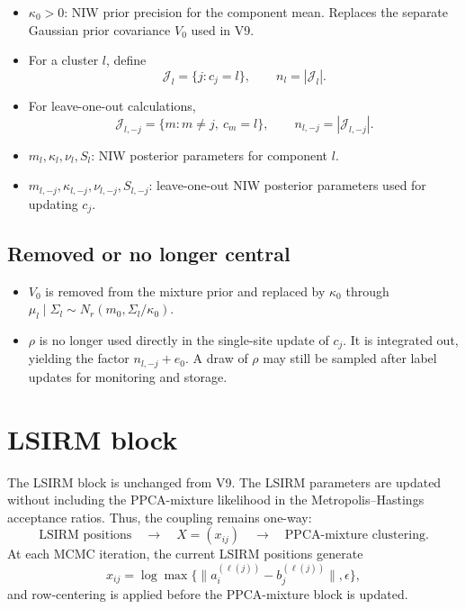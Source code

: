 \documentclass[11pt]{article}
\begin{document}
\begin{itemize}[leftmargin=1.5em]
    \item $\kappa_0>0$: NIW prior precision for the component mean.
    Replaces the separate Gaussian prior covariance $V_0$ used in V9.
    \item For a cluster $l$, define
    \[
        \mathcal J_l=\{j:c_j=l\},\qquad n_l=|\mathcal J_l|.
    \]
    \item For leave-one-out calculations,
    \[
        \mathcal J_{l,-j}=\{m:m\neq j,\ c_m=l\},\qquad
        n_{l,-j}=|\mathcal J_{l,-j}|.
    \]
    \item $m_l,\kappa_l,\nu_l,S_l$: NIW posterior parameters for component
    $l$.
    \item $m_{l,-j},\kappa_{l,-j},\nu_{l,-j},S_{l,-j}$: leave-one-out NIW
    posterior parameters used for updating $c_j$.
\end{itemize}

\subsection*{Removed or no longer central}

\begin{itemize}[leftmargin=1.5em]
    \item $V_0$ is removed from the mixture prior and replaced by
    $\kappa_0$ through
    $\mu_l\mid\Sigma_l\sim N_r(m_0,\Sigma_l/\kappa_0)$.
    \item $\rho$ is no longer used directly in the single-site update of
    $c_j$.  It is integrated out, yielding the factor $n_{l,-j}+e_0$.
    A draw of $\rho$ may still be sampled after label updates for monitoring
    and storage.
\end{itemize}

\section{LSIRM block}

The LSIRM block is unchanged from V9.  The LSIRM parameters are updated
without including the PPCA-mixture likelihood in the Metropolis--Hastings
acceptance ratios.  Thus, the coupling remains one-way:
\[
    \text{LSIRM positions}\quad\longrightarrow\quad
    X=(x_{ij})\quad\longrightarrow\quad
    \text{PPCA-mixture clustering}.
\]
At each MCMC iteration, the current LSIRM positions generate
\[
    x_{ij}=\log\max\{\|a_i^{(\ell(j))}-b_j^{(\ell(j))}\|,\epsilon\},
\]
and row-centering is applied before the PPCA-mixture block is updated.
\end{document}
